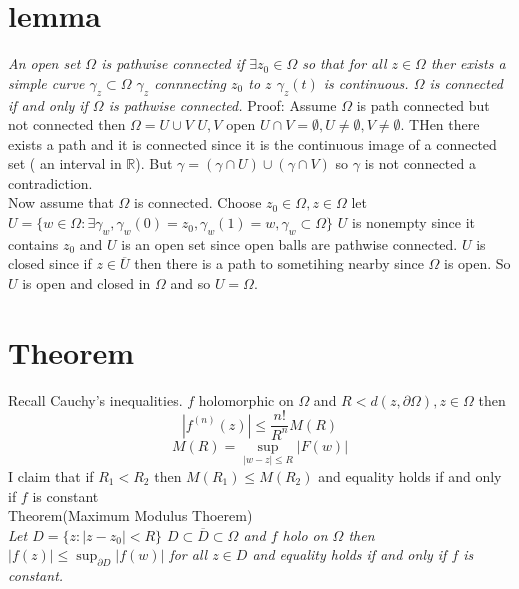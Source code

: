 \documentclass[11pt]{article}
\begin{document}
\section{lemma}
\emph{
    An open set  $\Omega$ is pathwise connected if 
    $\exists z_0 \in \Omega$ so that for all $z \in \Omega$ ther exists a simple curve  $\gamma_z \subset \Omega$ $\gamma_z$ connnecting $z_0$ to $z$
     $\gamma_z(t)$ is continuous.
     $\Omega$ is connected if and only if  $\Omega$ is pathwise connected.
}
Proof: Assume $\Omega$ is path connected but not connected then  $\Omega = U \cup V$  $U, V $ open  $U \cap V = \emptyset, U \ne \emptyset, V \ne \emptyset$.
THen there exists a path and it is connected since it is the continuous image of a connected set ( an interval in  $ \mathbb{R}$). But
$\gamma =(\gamma \cap U) \cup (\gamma \cap V)$ so $\gamma$ is not connected a contradiction.\\
Now assume that $\Omega$ is connected. Choose  $z_0 \in \Omega, z \in \Omega$ let $U = \{w \in \Omega: \exists \gamma_w, \gamma_w(0) = z_{0}, \gamma_w(1)=w, \gamma_w \subset \Omega\}$ $U$ is nonempty since it contains  $z_0$ and $U$ is an open set since open balls are pathwise connected.  $U$ is closed since if  $z \in \overline{ U}$ then there is a path to sometihing nearby  since $\Omega$ is open.
So  $U$ is open and closed in  $\Omega$ and so  $U = \Omega$.

\section{Theorem}
Recall Cauchy's inequalities.  $f$ holomorphic on  $\Omega$ and  $R < d(z, \partial \Omega), z \in \Omega$ 
then
\[
|f^{(n)}(z)| \le \frac{n!}{R^{n}}M(R)
\] 
\[
    M(R) = \sup_{|w-z| \le R} |F(w)|
\] 
I claim that if $ R_1 < R_2$ then $M(R_1) \le M(R_2)$ and equality holds if and only if $f$ is constant
\\
Theorem(Maximum Modulus Thoerem)\\
\emph{
    Let $D = \{z: |z-z_0|< R\}$ $D \subset \overline{ D} \subset \Omega$ and $f $ holo on  $\Omega$
    then $|f(z)| \le \sup_{\partial D}|f(w)|$ for all $z \in D$ and equality holds if and only if  $f$ is constant.
}
\end{document}
